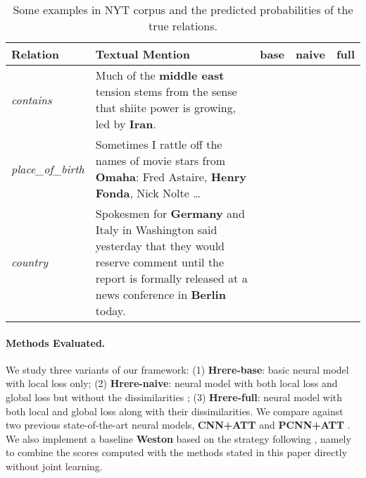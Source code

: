 \documentclass[11pt,a4paper]{article}
\def\HRERE{{\sc Hrere}\xspace}
\begin{document}
\begin{table*}[ht]
\small
\begin{center}
\begin{tabular}{| l | p{8cm} | l | l | l |}
\hline
Relation & Textual Mention & base & naive & full \\ \hline
{\em contains} & Much of the {\bf middle east} tension stems from the sense that shiite power is growing, led by {\bf Iran}. & 
 &  &  \\ \hline
{\em place\_of\_birth} & Sometimes I rattle off the names of movie stars from {\bf Omaha}: Fred Astaire, {\bf Henry Fonda}, Nick Nolte \dots & 
 &  &  \\ \hline
{\em country} & Spokesmen for {\bf Germany} and Italy in Washington said yesterday that they would reserve comment until the report is formally released at a news conference in {\bf Berlin} today. &
 &  &  \\ \hline
\end{tabular}
\end{center}
\caption{Some examples in NYT corpus and the predicted probabilities of the true relations.}\label{examples}
\end{table*}

\paragraph*{Methods Evaluated.}
\label{analysis}
We study three variants of our framework:
(1) {\bf \HRERE-base}: basic neural model with local loss  only;
(2) {\bf \HRERE-naive}: neural model with both local loss  and global loss  but without the dissimilarities ;
(3) {\bf \HRERE-full}: neural model with both local and global loss along with their dissimilarities.
We compare against two previous state-of-the-art neural models, {\bf CNN+ATT} and {\bf PCNN+ATT} \cite{lin2016neural}.
We also implement a baseline {\bf Weston} based on the strategy following , namely to combine the scores computed with the methods stated in this paper directly without joint learning.
\end{document}
